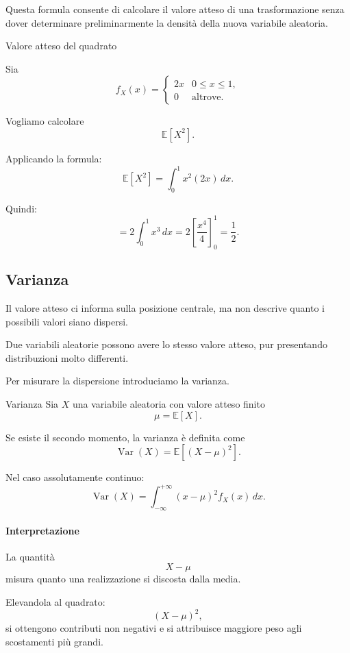 Questa formula consente di calcolare
il valore atteso di una trasformazione
senza dover determinare preliminarmente
la densità della nuova variabile aleatoria.

\begin{example}{Valore atteso del quadrato}

Sia
\[
f_X(x)=
\begin{cases}
2x & 0\leq x\leq1,\\
0 & \text{altrove}.
\end{cases}
\]

Vogliamo calcolare
\[
\mathbb{E}[X^2].
\]

Applicando la formula:
\[
\mathbb{E}[X^2]
=
\int_0^1 x^2(2x)\,dx.
\]

Quindi:
\[
=
2\int_0^1 x^3\,dx
=
2\left[\frac{x^4}{4}\right]_0^1
=
\boxed{\frac12}.
\]
\end{example}


\subsection{Varianza}

Il valore atteso ci informa
sulla posizione centrale,
ma non descrive quanto
i possibili valori siano dispersi.

Due variabili aleatorie possono
avere lo stesso valore atteso,
pur presentando distribuzioni
molto differenti.

Per misurare la dispersione
introduciamo la varianza.

\begin{definition}{Varianza}
Sia $X$ una variabile aleatoria
con valore atteso finito
\[
\mu=\mathbb{E}[X].
\]

Se esiste il secondo momento,
la varianza è definita come
\[
\boxed{
\operatorname{Var}(X)
=
\mathbb{E}[(X-\mu)^2].
}
\]

Nel caso assolutamente continuo:
\[
\boxed{
\operatorname{Var}(X)
=
\int_{-\infty}^{+\infty}
(x-\mu)^2f_X(x)\,dx.
}
\]
\end{definition}

\paragraph{Interpretazione}

La quantità
\[
X-\mu
\]
misura quanto una realizzazione
si discosta dalla media.

Elevandola al quadrato:
\[
(X-\mu)^2,
\]
si ottengono contributi non negativi
e si attribuisce maggiore peso
agli scostamenti più grandi.

